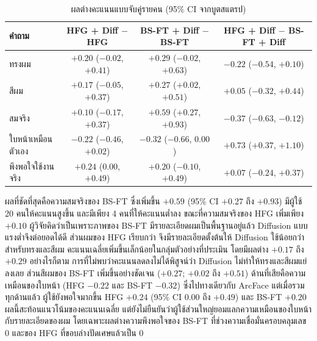 \begin{table}[!htbp]
\centering
\caption{ผลต่างคะแนนแบบจับคู่รายคน (95\% CI จากบูตสแตรป)}
\label{tab:survey_pair}
\footnotesize
\begin{tabular}{|l|c|c|c|}
\hline
\textbf{คำถาม} & \textbf{HFG + Diff $-$ HFG} & \textbf{BS-FT + Diff $-$ BS-FT} & \textbf{HFG + Diff $-$ BS-FT + Diff} \\ \hline
ทรงผม & $+0.20$ ($-0.02$, $+0.41$) & $+0.29$ ($-0.02$, $+0.63$) & $-0.22$ ($-0.54$, $+0.10$) \\ \hline
สีผม & $+0.17$ ($-0.05$, $+0.37$) & $+0.27$ ($+0.02$, $+0.51$) & $+0.05$ ($-0.32$, $+0.44$) \\ \hline
สมจริง & $+0.10$ ($-0.17$, $+0.37$) & $+0.59$ ($+0.27$, $+0.93$) & $-0.37$ ($-0.63$, $-0.12$) \\ \hline
ใบหน้าเหมือนตัวเอง & $-0.22$ ($-0.46$, $+0.02$) & $-0.32$ ($-0.66$, $0.00$) & $+0.73$ ($+0.37$, $+1.10$) \\ \hline
พึงพอใจใช้งานจริง & $+0.24$ ($0.00$, $+0.49$) & $+0.20$ ($-0.10$, $+0.49$) & $+0.07$ ($-0.24$, $+0.37$) \\ \hline
\end{tabular}
\par\vspace{3pt}{\footnotesize\raggedright หมายเหตุ: CI = Confidence Interval (ช่วงความเชื่อมั่น), HFG = HairFastGAN, Diff = ขั้นขัดเกลาด้วย Diffusion, BS-FT (Barbershop-FT) = Barbershop ที่ปรับจูนแล้ว (Fine-tuned)\par}

\end{table}

ผลที่ชัดที่สุดคือความสมจริงของ BS-FT ซึ่งเพิ่มขึ้น $+0.59$ (95\% CI $+0.27$ ถึง $+0.93$)
มีผู้ใช้ 20 คนให้คะแนนสูงขึ้น และมีเพียง 4 คนที่ให้คะแนนต่ำลง
ขณะที่ความสมจริงของ HFG เพิ่มเพียง $+0.10$ ผู้วิจัยคิดว่าเป็นเพราะภาพของ BS-FT มีรายละเอียดผมเป็นพื้นฐานอยู่แล้ว
Diffusion แบบแรงต่ำจึงต่อยอดได้ดี ส่วนผมของ HFG เรียบกว่า จึงมีรายละเอียดตั้งต้นให้ Diffusion ใช้น้อยกว่า
สำหรับทรงและสีผม คะแนนเฉลี่ยเพิ่มขึ้นเล็กน้อยในกลุ่มตัวอย่างที่ประเมิน
โดยมีผลต่าง $+0.17$ ถึง $+0.29$
อย่างไรก็ตาม การที่ไม่พบว่าคะแนนลดลงไม่ได้พิสูจน์ว่า Diffusion ไม่ทำให้ทรงและสีผมแย่ลงเลย
ส่วนสีผมของ BS-FT เพิ่มขึ้นอย่างชัดเจน ($+0.27$; $+0.02$ ถึง $+0.51$)
ด้านที่เสียคือความเหมือนของใบหน้า (HFG $-0.22$ และ BS-FT $-0.32$) ซึ่งไปทางเดียวกับ ArcFace
แต่เมื่อรวมทุกด้านแล้ว ผู้ใช้ยังพอใจมากขึ้น HFG $+0.24$ (95\% CI 0.00 ถึง $+0.49$) และ BS-FT $+0.20$
ผลนี้สะท้อนแนวโน้มของคะแนนเฉลี่ย แต่ยังไม่ยืนยันว่าผู้ใช้ส่วนใหญ่ยอมแลกความเหมือนของใบหน้ากับรายละเอียดของผม
โดยเฉพาะผลต่างความพึงพอใจของ BS-FT ที่ช่วงความเชื่อมั่นครอบคลุมเลข 0 และของ HFG ที่ขอบล่างปัดเศษแล้วเป็น 0

